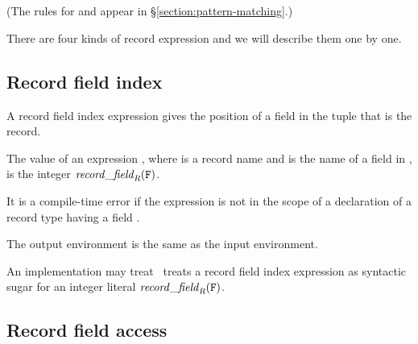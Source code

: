 \SYNTAX

\begin{rules}
       {   \  \OR
            \OR
        }

       {  }

       { \OR
         \TXT{,}\ }

       { }

       {\TXT{=} }
\end{rules}
(The rules for  and  appear
in \S\ref{section:pattern-matching}.)

There are four kinds of record expression and we will describe them one by one.

\subsection{Record field index}

\label{section:field-index}
A record field index expression gives the position of a field in the tuple
that is the record.

\EVALUATION

The value of an expression , where  is a
record name and  is the name of a field in , is the
integer $\mathit{record\_field}_{\mbox{\scriptsize\tt{\sl{R}}}}({\tt{\sl F}})$.

It is a compile-time error if the expression is not in the scope of
a declaration of a record type  having a field .

\ENVIRONMENTS

The output environment is the same as the input environment.

\NOTE

\ifStd An implementation may treat \fi
\ifOld \OldErlang\ treats \fi
a record field index expression 
as syntactic sugar for an integer literal $\mathit{record\_field}_{\mbox{\scriptsize\tt{\sl{R}}}}({\tt{\sl F}})$.

\subsection{Record field access}

